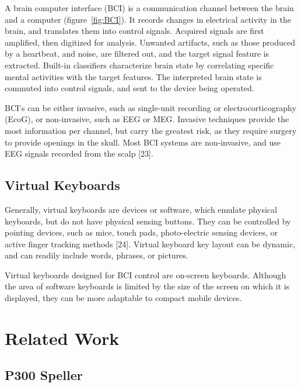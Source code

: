 \documentclass[12pt,titlepage]{article}
\begin{document}
A brain computer interface (BCI) is a communication channel between the brain and a 
computer (figure~\ref{fig:BCI}). It records changes in electrical activity in the brain, and translates them into 
control signals.  Acquired signals are first amplified, then digitized for analysis.  Unwanted 
artifacts, such as those produced by a heartbeat, and noise, are filtered out, and the target signal
feature is extracted.   Built-in classifiers characterize brain state by correlating specific mental 
activities with the target features.  The interpreted brain state is commuted into control signals, and sent 
to the device being operated.

BCI's can be either invasive, such as single-unit recording or electrocorticography (EcoG), or 
non-invasive, such as EEG or MEG.  Invasive techniques provide the most information per 
channel, but carry the greatest risk, as they require surgery to provide openings in the skull. 
Most BCI systems are non-invasive, and use EEG signals recorded from the scalp [23].

\subsection{Virtual Keyboards} %

Generally, virtual keyboards are devices or software, which emulate physical keyboards, but do 
not have physical sensing buttons.  They can be controlled by pointing devices, such as mice, 
touch pads, photo-electric sensing devices, or active finger tracking methods [24].  Virtual 
keyboard key layout can be dynamic, and can readily include words, phrases, or pictures. 

Virtual keyboards designed for BCI control are on-screen keyboards.  Although the area of 
software keyboards is limited by the size of the screen on which it is displayed, they can be 
more adaptable to compact mobile devices.

\section{Related Work}

\subsection{P300 Speller}
\end{document}
